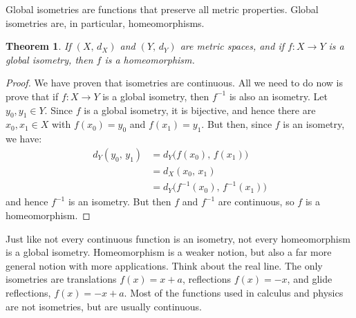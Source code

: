 \documentclass{article}
\theoremstyle{plain}
\newtheorem{theorem}{Theorem}[section]
\theoremstyle{normal}
\begin{document}
        Global isometries are functions that preserve all metric properties.
        Global isometries are, in particular, homeomorphisms.
        \begin{theorem}
            If $(X,\,d_{X})$ and $(Y,\,d_{Y})$ are metric spaces, and if
            $f:X\rightarrow{Y}$ is a global isometry, then $f$ is a
            homeomorphism.
        \end{theorem}
        \begin{proof}
            We have proven that isometries are continuous. All we need to do
            now is prove that if $f:X\rightarrow{Y}$ is a global isometry,
            then $f^{-1}$ is also an isometry. Let $y_{0},y_{1}\in{Y}$.
            Since $f$ is a global isometry, it is bijective, and hence there
            are $x_{0},x_{1}\in{X}$ with $f(x_{0})=y_{0}$ and $f(x_{1})=y_{1}$.
            But then, since $f$ is an isometry, we have:
            \begin{align}
                d_{Y}(y_{0},\,y_{1})
                    &=d_{Y}\big(f(x_{0}),\,f(x_{1})\big)\\
                    &=d_{X}(x_{0},\,x_{1})\\
                    &=d_{Y}\big(f^{-1}(x_{0}),\,f^{-1}(x_{1})\big)
            \end{align}
            and hence $f^{-1}$ is an isometry. But then $f$ and $f^{-1}$ are
            continuous, so $f$ is a homeomorphism.
        \end{proof}
        Just like not every continuous function is an isometry, not every
        homeomorphism is a global isometry. Homeomorphism is a weaker notion,
        but also a far more general notion with more applications. Think about
        the real line. The only isometries are translations
        $f(x)=x+a$, reflections $f(x)=-x$, and glide reflections,
        $f(x)=-x+a$. Most of the functions used in calculus and physics are not
        isometries, but are usually continuous.
\end{document}
